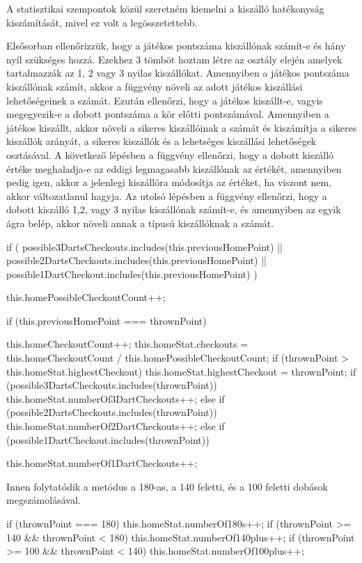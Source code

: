 A statisztikai szempontok közül szeretném kiemelni a kiszálló hatékonyság kiszámítását, mivel ez volt a legösszetettebb. 

Elsősorban ellenőrizzük, hogy a játékos pontszáma kiszállónak számít-e és hány nyíl szükséges hozzá. Ezekhez 3 tömböt hoztam létre az osztály elején amelyek tartalmazzák az 1, 2 vagy 3 nyilas kiszállókat. Amennyiben a játékos pontszáma kiszállónak számít, akkor a függvény növeli az adott játékos kiszállási lehetőségeinek a számát.
Ezután ellenőrzi, hogy a játékos kiszállt-e, vagyis megegyezik-e a dobott pontszáma a kör előtti pontszámával. Amennyiben a játékos kiszállt, akkor növeli a sikeres kiszállóinak a számát és kiszámítja a sikeres kiszállók arányát, a sikeres kiszállók és a lehetséges kiszállási lehetőségek osztásával. A következő lépésben a függvény ellenőrzi, hogy a dobott kiszálló értéke meghaladja-e az eddigi legmagasabb kiszállónak az értékét, amennyiben pedig igen, akkor a jelenlegi kiszállóra módosítja az értéket, ha viszont nem, akkor változatlanul hagyja. Az utolsó lépésben a függvény ellenőrzi, hogy a dobott kiszálló 1,2, vagy 3 nyilas kiszállónak számít-e, és amennyiben az egyik ágra belép, akkor növeli annak a típusú kiszállóknak a számát.

\begin{cpp}      
if (
 possible3DartsCheckouts.includes(this.previousHomePoint) || 
 possible2DartsCheckouts.includes(this.previousHomePoint) || 
 possible1DartCheckout.includes(this.previousHomePoint)
) {
 this.homePossibleCheckoutCount++;
        
 if (this.previousHomePoint === thrownPoint) {
  this.homeCheckoutCount++;
  this.homeStat.checkouts = this.homeCheckoutCount / this.homePossibleCheckoutCount;
  if (thrownPoint > this.homeStat.highestCheckout) {
    this.homeStat.highestCheckout = thrownPoint;
  }
  if (possible3DartsCheckouts.includes(thrownPoint)) {
    this.homeStat.numberOf3DartCheckouts++;
  } else if (possible2DartsCheckouts.includes(thrownPoint)) {
    this.homeStat.numberOf2DartCheckouts++;
  } else if (possible1DartCheckout.includes(thrownPoint)) {
    this.homeStat.numberOf1DartCheckouts++;
  
  }
 }
}      
\end{cpp}

Innen folytatódik a metódus a 180-as, a 140 feletti, és a 100 feletti dobások megszámolásával.

\begin{cpp}
if (thrownPoint === 180) {
 this.homeStat.numberOf180s++;
}
if (thrownPoint >= 140 && thrownPoint < 180) {
 this.homeStat.numberOf140plus++;
}
if (thrownPoint >= 100 && thrownPoint < 140) {
 this.homeStat.numberOf100plus++;
}
\end{cpp}

